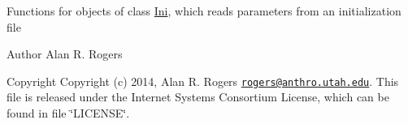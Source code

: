Functions for objects of class \hyperlink{struct_ini}{Ini}, which reads parameters from an initialization file

\begin{DoxyAuthor}{Author}
Alan R. Rogers 
\end{DoxyAuthor}
\begin{DoxyCopyright}{Copyright}
Copyright (c) 2014, Alan R. Rogers \href{mailto:rogers@anthro.utah.edu}{\tt rogers@anthro.\+utah.\+edu}. This file is released under the Internet Systems Consortium License, which can be found in file \char`\"{}\+L\+I\+C\+E\+N\+S\+E\char`\"{}. 
\end{DoxyCopyright}
